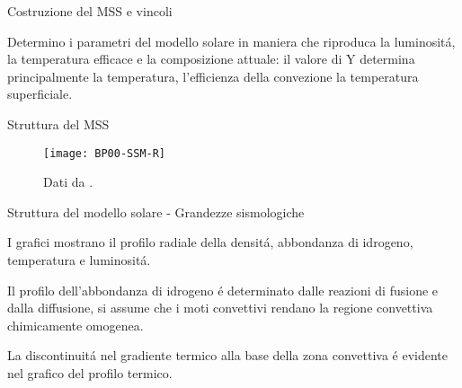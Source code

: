 \documentclass[10pt,xcolor={usenames},fleqn,mathserif,serif]{beamer}
\begin{document}
\begin{wordonframe}{Costruzione del MSS e vincoli}


Determino i parametri del modello solare in maniera che riproduca la luminosit\'a, la temperatura efficace e la composizione attuale: il valore di Y determina principalmente la temperatura, l'efficienza della convezione la temperatura superficiale.





\end{wordonframe}


\begin{frame}{Struttura del MSS}

\begin{figure}[!h]
\texttt{[image: BP00-SSM-R]}
\caption{Dati da \cite{BP2000}.}
\end{figure}

\end{frame}

\begin{wordonframe}{Struttura del modello solare - Grandezze sismologiche}

I grafici mostrano il profilo radiale della densit\'a, abbondanza di idrogeno, temperatura e luminosit\'a.

Il profilo dell'abbondanza di idrogeno \'e determinato dalle reazioni di fusione e dalla diffusione, si assume che i moti convettivi rendano la regione convettiva chimicamente omogenea.

La discontinuit\'a nel gradiente termico alla base della zona convettiva \'e evidente nel grafico del profilo termico.

\end{wordonframe}
\end{document}
